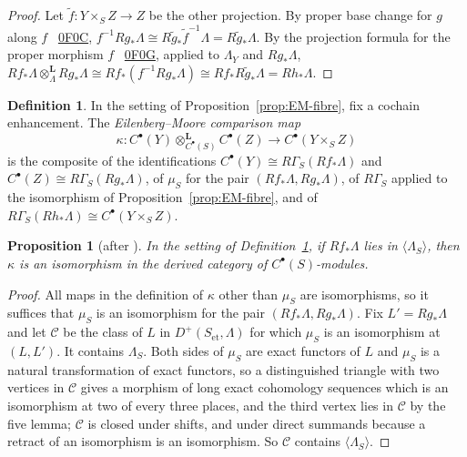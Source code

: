\documentclass[11pt]{amsart}
\theoremstyle{plain}
\newtheorem{proposition}[theorem]{Proposition}
\theoremstyle{definition}
\newtheorem{definition}[theorem]{Definition}
\theoremstyle{remark}
\numberwithin{equation}{section}
\newcommand{\stackstag}[1]{\cite[Tag~#1]{StacksProject}\,%
  \href{https://stacks.math.columbia.edu/tag/#1}{\textsf{#1}}}
\begin{document}
\begin{proof}
Let $\tilde f:Y\times_SZ\to Z$ be the other projection. By proper base
change for $g$ along $f$ \stackstag{0F0C},
$f^{-1}Rg_*\Lambda\cong R\tilde g_*\tilde f^{-1}\Lambda=
R\tilde g_*\Lambda$. By the projection formula for the proper
morphism $f$ \stackstag{0F0G}, applied to $\Lambda_Y$ and
$Rg_*\Lambda$,
$Rf_*\Lambda\otimes^{\mathbf L}_\Lambda Rg_*\Lambda\cong
Rf_*(f^{-1}Rg_*\Lambda)\cong Rf_*R\tilde g_*\Lambda=Rh_*\Lambda$.
\end{proof}

\begin{definition}\label{def:EM-kappa}
In the setting of Proposition~\ref{prop:EM-fibre}, fix a cochain
enhancement. The \emph{Eilenberg--Moore comparison map}
\[
\kappa:C^\bullet(Y)\otimes^{\mathbf L}_{C^\bullet(S)}C^\bullet(Z)\to
C^\bullet(Y\times_SZ)
\]
is the composite of the identifications $C^\bullet(Y)\cong
R\Gamma_S(Rf_*\Lambda)$ and $C^\bullet(Z)\cong R\Gamma_S(Rg_*\Lambda)$,
of $\mu_S$ for the pair $(Rf_*\Lambda,Rg_*\Lambda)$, of $R\Gamma_S$
applied to the isomorphism of Proposition~\ref{prop:EM-fibre}, and of
$R\Gamma_S(Rh_*\Lambda)\cong C^\bullet(Y\times_SZ)$.
\end{definition}

\begin{proposition}[{after \cite[Proposition~1.1.9, p.~6, and
Corollary~1.1.10, p.~7]{Lurie2011DAGXIII}}]\label{prop:EM}
In the setting of Definition~\ref{def:EM-kappa}, if $Rf_*\Lambda$ lies
in $\langle\Lambda_S\rangle$, then $\kappa$ is an isomorphism in the
derived category of $C^\bullet(S)$-modules.
\end{proposition}

\begin{proof}
All maps in the definition of $\kappa$ other than $\mu_S$ are
isomorphisms, so it suffices that $\mu_S$ is an isomorphism for the
pair $(Rf_*\Lambda,Rg_*\Lambda)$. Fix $L'=Rg_*\Lambda$ and let
$\mathcal C$ be the class of $L$ in $D^+(S_{\mathrm{et}},\Lambda)$ for
which $\mu_S$ is an isomorphism at $(L,L')$. It contains $\Lambda_S$.
Both sides of $\mu_S$ are exact functors of $L$ and $\mu_S$ is a
natural transformation of exact functors, so a distinguished triangle
with two vertices in $\mathcal C$ gives a morphism of long exact
cohomology sequences which is an isomorphism at two of every three
places, and the third vertex lies in $\mathcal C$ by the five lemma;
$\mathcal C$ is closed under shifts, and under direct summands because
a retract of an isomorphism is an isomorphism. So $\mathcal C$
contains $\langle\Lambda_S\rangle$.
\end{proof}
\end{document}
